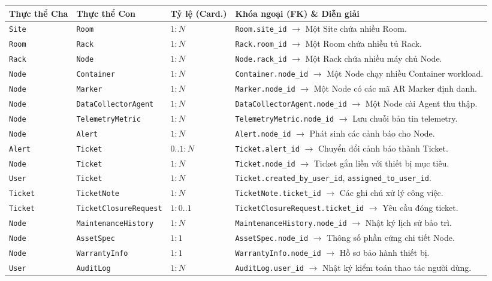 \begin{longtable}{|p{3cm}|p{3cm}|p{2.5cm}|p{5cm}|}
\hline
\textbf{Thực thể Cha} & \textbf{Thực thể Con} & \textbf{Tỷ lệ (Card.)} & \textbf{Khóa ngoại (FK) \& Diễn giải} \\ \hline
\endhead
\texttt{Site} & \texttt{Room} & $1 : N$ & \texttt{Room.site\_id} $\rightarrow$ Một Site chứa nhiều Room. \\ \hline
\texttt{Room} & \texttt{Rack} & $1 : N$ & \texttt{Rack.room\_id} $\rightarrow$ Một Room chứa nhiều tủ Rack. \\ \hline
\texttt{Rack} & \texttt{Node} & $1 : N$ & \texttt{Node.rack\_id} $\rightarrow$ Một Rack chứa nhiều máy chủ Node. \\ \hline
\texttt{Node} & \texttt{Container} & $1 : N$ & \texttt{Container.node\_id} $\rightarrow$ Một Node chạy nhiều Container workload. \\ \hline
\texttt{Node} & \texttt{Marker} & $1 : N$ & \texttt{Marker.node\_id} $\rightarrow$ Một Node có các mã AR Marker định danh. \\ \hline
\texttt{Node} & \texttt{DataCollectorAgent} & $1 : N$ & \texttt{DataCollectorAgent.node\_id} $\rightarrow$ Một Node cài Agent thu thập. \\ \hline
\texttt{Node} & \texttt{TelemetryMetric} & $1 : N$ & \texttt{TelemetryMetric.node\_id} $\rightarrow$ Lưu chuỗi bản tin telemetry. \\ \hline
\texttt{Node} & \texttt{Alert} & $1 : N$ & \texttt{Alert.node\_id} $\rightarrow$ Phát sinh các cảnh báo cho Node. \\ \hline
\texttt{Alert} & \texttt{Ticket} & $0..1 : N$ & \texttt{Ticket.alert\_id} $\rightarrow$ Chuyển đổi cảnh báo thành Ticket. \\ \hline
\texttt{Node} & \texttt{Ticket} & $1 : N$ & \texttt{Ticket.node\_id} $\rightarrow$ Ticket gắn liền với thiết bị mục tiêu. \\ \hline
\texttt{User} & \texttt{Ticket} & $1 : N$ & \texttt{Ticket.created\_by\_user\_id}, \texttt{assigned\_to\_user\_id}. \\ \hline
\texttt{Ticket} & \texttt{TicketNote} & $1 : N$ & \texttt{TicketNote.ticket\_id} $\rightarrow$ Các ghi chú xử lý công việc. \\ \hline
\texttt{Ticket} & \texttt{TicketClosureRequest} & $1 : 0..1$ & \texttt{TicketClosureRequest.ticket\_id} $\rightarrow$ Yêu cầu đóng ticket. \\ \hline
\texttt{Node} & \texttt{MaintenanceHistory} & $1 : N$ & \texttt{MaintenanceHistory.node\_id} $\rightarrow$ Nhật ký lịch sử bảo trì. \\ \hline
\texttt{Node} & \texttt{AssetSpec} & $1 : 1$ & \texttt{AssetSpec.node\_id} $\rightarrow$ Thông số phần cứng chi tiết Node. \\ \hline
\texttt{Node} & \texttt{WarrantyInfo} & $1 : 1$ & \texttt{WarrantyInfo.node\_id} $\rightarrow$ Hồ sơ bảo hành thiết bị. \\ \hline
\texttt{User} & \texttt{AuditLog} & $1 : N$ & \texttt{AuditLog.user\_id} $\rightarrow$ Nhật ký kiểm toán thao tác người dùng. \\ \hline
\end{longtable}

